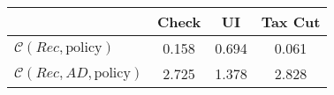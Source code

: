 \begin{tabular}{@{}lccc@{}}
\toprule
                          & Check      & UI    & Tax Cut    \\  \midrule
$\mathcal{C}(Rec,\text{policy})$ & 0.158  & 0.694  & 0.061     \\
$\mathcal{C}(Rec, AD,\text{policy})$ & 2.725  & 1.378  & 2.828     \\
\end{tabular}
